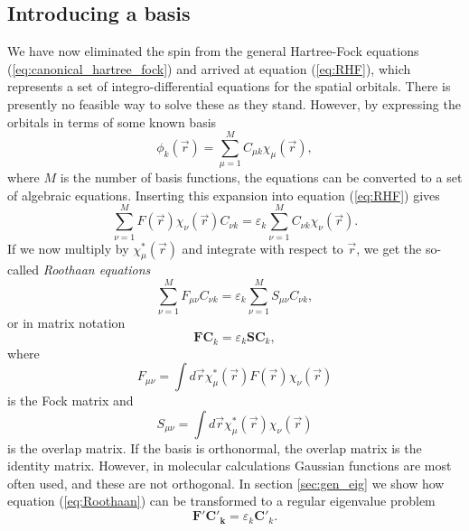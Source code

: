 \subsection{Introducing a basis}
We have now eliminated the spin from the general Hartree-Fock equations (\ref{eq:canonical_hartree_fock}) and arrived at equation (\ref{eq:RHF}), which represents
a set of integro-differential equations for the spatial orbitals. There is presently no feasible way to solve these as they stand.
However, by expressing the orbitals in terms of some known basis
\begin{equation}
\label{eq:linear_expansion}
 \phi_k(\vec r) = \sum_{\mu=1}^M C_{\mu k}\chi_\mu(\vec r),
\end{equation}
where $M$ is the number of basis functions, the equations can be converted to a set of algebraic equations. Inserting this expansion into equation (\ref{eq:RHF}) gives
\begin{equation}
 \sum_{\nu=1}^M F(\vec r)\chi_\nu(\vec r) C_{\nu k} = \varepsilon_k \sum_{\nu=1}^M C_{\nu k} \chi_{\nu}(\vec r).
\end{equation}
If we now multiply by $\chi^*_\mu(\vec r)$ and integrate with respect to $\vec r$, we get the so-called \emph{Roothaan equations} \cite{roothan}
\begin{equation}
 \sum_{\nu=1}^M F_{\mu\nu}C_{\nu k} = \varepsilon_k\sum_{\nu=1}^M S_{\mu\nu}C_{\nu k},
\end{equation}
or in matrix notation
\begin{equation}
\label{eq:Roothaan}
 \mathbf{FC}_k = \varepsilon_k\mathbf{SC}_k,
\end{equation}
where
\begin{equation}
 F_{\mu\nu} = \int d\vec r \chi^*_\mu(\vec r)F(\vec r)\chi_\nu(\vec r)
\end{equation}
is the Fock matrix and
\begin{equation}
 S_{\mu\nu} = \int d\vec r \chi^*_\mu(\vec r)\chi_\nu(\vec r)
\end{equation}
is the overlap matrix. If the basis is orthonormal, the overlap matrix is the identity matrix. However, in molecular calculations Gaussian functions are
most often used, and these are not orthogonal. In section \ref{sec:gen_eig} we show how equation (\ref{eq:Roothaan}) can be transformed to a regular
eigenvalue problem
\begin{equation}
 \mathbf{F'C'_k} = \varepsilon_k\mathbf C'_k.
\end{equation}


